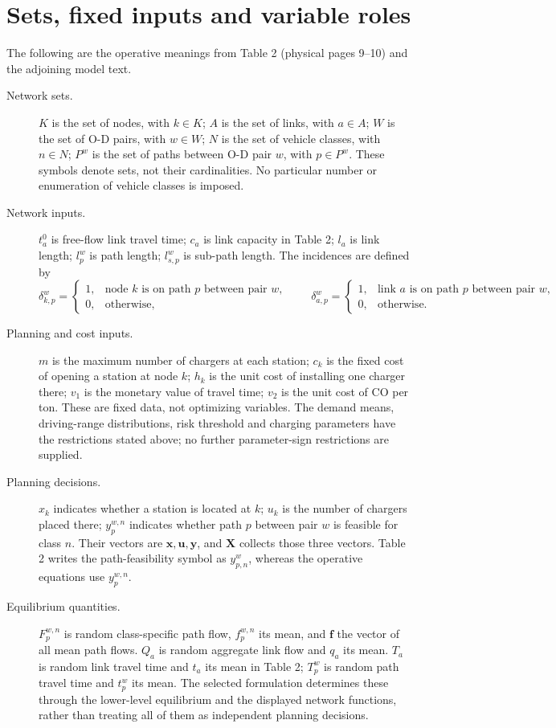 \documentclass{article}
\begin{document}
\section*{Sets, fixed inputs and variable roles}
The following are the operative meanings from Table 2 (physical pages 9--10) and the adjoining model text.
\begin{description}
\item[Network sets.] $K$ is the set of nodes, with $k\in K$; $A$ is the set of links, with $a\in A$; $W$ is the set of O-D pairs, with $w\in W$; $N$ is the set of vehicle classes, with $n\in N$; $P^w$ is the set of paths between O-D pair $w$, with $p\in P^w$. These symbols denote sets, not their cardinalities. No particular number or enumeration of vehicle classes is imposed.
\item[Network inputs.] $t_a^0$ is free-flow link travel time; $c_a$ is link capacity in Table 2; $l_a$ is link length; $l_p^w$ is path length; $l_{s,p}^w$ is sub-path length. The incidences are defined by
\[
\delta_{k,p}^w=
\begin{cases}1,&\text{node }k\text{ is on path }p\text{ between pair }w,\\0,&\text{otherwise},\end{cases}
\qquad
\delta_{a,p}^w=
\begin{cases}1,&\text{link }a\text{ is on path }p\text{ between pair }w,\\0,&\text{otherwise}.\end{cases}
\]
\item[Planning and cost inputs.] $m$ is the maximum number of chargers at each station; $c_k$ is the fixed cost of opening a station at node $k$; $h_k$ is the unit cost of installing one charger there; $v_1$ is the monetary value of travel time; $v_2$ is the unit cost of CO per ton. These are fixed data, not optimizing variables. The demand means, driving-range distributions, risk threshold and charging parameters have the restrictions stated above; no further parameter-sign restrictions are supplied.
\item[Planning decisions.] $x_k$ indicates whether a station is located at $k$; $u_k$ is the number of chargers placed there; $y_p^{w,n}$ indicates whether path $p$ between pair $w$ is feasible for class $n$. Their vectors are $\mathbf x,\mathbf u,\mathbf y$, and $\mathbf X$ collects those three vectors. Table 2 writes the path-feasibility symbol as $y_{p,n}^w$, whereas the operative equations use $y_p^{w,n}$.
\item[Equilibrium quantities.] $F_p^{w,n}$ is random class-specific path flow, $f_p^{w,n}$ its mean, and $\mathbf f$ the vector of all mean path flows. $Q_a$ is random aggregate link flow and $q_a$ its mean. $T_a$ is random link travel time and $t_a$ its mean in Table 2; $T_p^w$ is random path travel time and $t_p^w$ its mean. The selected formulation determines these through the lower-level equilibrium and the displayed network functions, rather than treating all of them as independent planning decisions.

\end{description}
\end{document}
